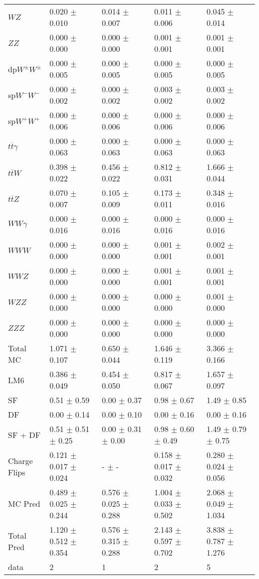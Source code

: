 \begin{tabular}{l | l l l l}
$WZ$ &  0.020 $\pm$  0.010 &  0.014 $\pm$  0.007 &  0.011 $\pm$  0.006 &  0.045 $\pm$  0.014\\
$ZZ$ &  0.000 $\pm$   0.000 &  0.000 $\pm$   0.000 &  0.001 $\pm$  0.001 &  0.001 $\pm$  0.001\\
\hline
dp$W^{\pm}W^{\pm}$ &  0.000 $\pm$  0.005 &  0.000 $\pm$  0.005 &  0.000 $\pm$  0.005 &  0.000 $\pm$  0.005\\
sp$W^{-}W^{-}$ &  0.000 $\pm$  0.002 &  0.000 $\pm$  0.002 &  0.003 $\pm$  0.002 &  0.003 $\pm$  0.002\\
sp$W^{+}W^{+}$ &  0.000 $\pm$  0.006 &  0.000 $\pm$  0.006 &  0.000 $\pm$  0.006 &  0.000 $\pm$  0.006\\
$t\overline{t}\gamma$ &  0.000 $\pm$  0.063 &  0.000 $\pm$  0.063 &  0.000 $\pm$  0.063 &  0.000 $\pm$  0.063\\
$t\overline{t}W$ &  0.398 $\pm$  0.022 &  0.456 $\pm$  0.022 &  0.812 $\pm$  0.031 &  1.666 $\pm$  0.044\\
$t\overline{t}Z$ &  0.070 $\pm$  0.007 &  0.105 $\pm$  0.009 &  0.173 $\pm$  0.011 &  0.348 $\pm$  0.016\\
$WW\gamma$ &  0.000 $\pm$  0.016 &  0.000 $\pm$  0.016 &  0.000 $\pm$  0.016 &  0.000 $\pm$  0.016\\
$WWW$ &   0.000 $\pm$   0.000 &   0.000 $\pm$   0.000 &  0.001 $\pm$  0.001 &  0.002 $\pm$  0.001\\
$WWZ$ &  0.000 $\pm$   0.000 &  0.000 $\pm$   0.000 &  0.001 $\pm$  0.001 &  0.001 $\pm$  0.001\\
$WZZ$ &   0.000 $\pm$   0.000 &   0.000 $\pm$   0.000 &   0.000 $\pm$   0.000 &  0.001 $\pm$   0.000\\
$ZZZ$ &   0.000 $\pm$   0.000 &   0.000 $\pm$   0.000 &   0.000 $\pm$   0.000 &   0.000 $\pm$   0.000\\
\hline
Total MC &  1.071 $\pm$  0.107 &  0.650 $\pm$  0.044 &  1.646 $\pm$  0.119 &  3.366 $\pm$  0.166\\
\hline\hline
\hline
LM6 &  0.386 $\pm$  0.049 &  0.454 $\pm$  0.050 &  0.817 $\pm$  0.067 &  1.657 $\pm$  0.097\\
\hline\hline
\hline\hline
 SF  & 0.51 $\pm$ 0.59 & 0.00 $\pm$ 0.37 & 0.98 $\pm$ 0.67 & 1.49 $\pm$ 0.85\\
 DF  & 0.00 $\pm$ 0.14 & 0.00 $\pm$ 0.10 & 0.00 $\pm$ 0.16 & 0.00 $\pm$ 0.16\\
\hline
 SF + DF  & 0.51 $\pm$ 0.51 $\pm$ 0.25 & 0.00 $\pm$ 0.31 $\pm$ 0.00 & 0.98 $\pm$ 0.60 $\pm$ 0.49 & 1.49 $\pm$ 0.79 $\pm$ 0.75\\
\hline\hline
Charge Flips & 0.121 $\pm$ 0.017 $\pm$ 0.024 & - $\pm$ - & 0.158 $\pm$ 0.017 $\pm$ 0.032 & 0.280 $\pm$ 0.024 $\pm$ 0.056\\
\hline\hline
\hline
MC Pred &  0.489 $\pm$  0.025 $\pm$  0.244 &  0.576 $\pm$  0.025 $\pm$  0.288 &  1.004 $\pm$  0.033 $\pm$  0.502 &  2.068 $\pm$  0.049 $\pm$  1.034\\
\hline\hline
Total Pred &  1.120 $\pm$  0.512 $\pm$  0.354 &  0.576 $\pm$  0.315 $\pm$  0.288 &  2.143 $\pm$  0.597 $\pm$  0.702 &  3.838 $\pm$  0.787 $\pm$  1.276\\
\hline\hline
data & 2 & 1 & 2 & 5\\
\hline\hline
\end{tabular}
